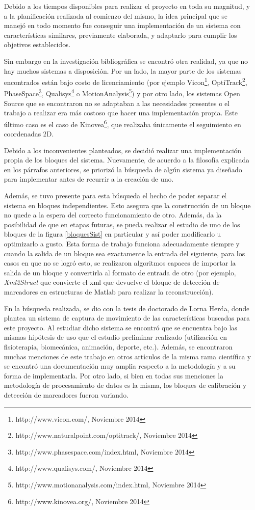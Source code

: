 Debido a los tiempos disponibles para realizar el proyecto en toda su magnitud, y a la planificación realizada al comienzo del mismo, la idea principal que se manejó en todo momento fue conseguir una implementación de un sistema con características similares, previamente elaborada, y adaptarlo para cumplir los objetivos establecidos. 

Sin embargo en la investigación bibliográfica se encontró otra realidad, ya que no hay muchos sistemas a disposición. Por un lado, la mayor parte de los sistemas encontrados están bajo costo de licenciamiento (por ejemplo Vicon\footnote{http://www.vicon.com/, Noviembre 2014}, OptiTrack\footnote{http://www.naturalpoint.com/optitrack/, Noviembre 2014}, PhaseSpace\footnote{http://www.phasespace.com/index.html, Noviembre 2014}, Qualisys\footnote{http://www.qualisys.com/, Noviembre 2014} o MotionAnalysis\footnote{http://www.motionanalysis.com/index.html, Noviembre 2014}) y por otro lado, los sistemas Open Source que se encontraron no se adaptaban a las necesidades presentes o el trabajo a realizar era más costoso que hacer una implementación propia. Este último caso es el caso de Kinovea\footnote{http://www.kinovea.org/, Noviembre 2014}, que realizaba únicamente el seguimiento en coordenadas 2D.

Debido a los inconvenientes planteados, se decidió realizar una implementación propia de los bloques del sistema. Nuevamente, de acuerdo a la filosofía explicada en los párrafos anteriores, se priorizó la búsqueda de algún sistema ya diseñado para implementar antes de recurrir a la creación de uno.

Además, se tuvo presente para esta búsqueda el hecho de poder separar el sistema en bloques independientes. Esto asegura que la construcción de un bloque no quede a la espera del correcto funcionamiento de otro. Además, da la posibilidad de que en etapas futuras, se pueda realizar el estudio de uno de los bloques de la figura \ref{bloquesSist} en particular y así poder modificarlo u optimizarlo a gusto. Esta forma de trabajo funciona adecuadamente siempre y cuando la salida de un bloque sea exactamente la entrada del siguiente, para los casos en que no se logró esto, se realizaron algoritmos capaces de importar la salida de un bloque y convertirla al formato de entrada de otro (por ejemplo, \textit{Xml2Struct} que convierte el xml que devuelve el bloque de detección de marcadores en estructuras de Matlab para realizar la reconstrucción).

En la búsqueda realizada, se dio con la tesis de doctorado de Lorna Herda\cite{herda}, donde plantea un sistema de captura de movimiento de las características buscadas para este proyecto. Al estudiar dicho sistema se encontró que se encuentra bajo las mismas hipótesis de uso que el estudio preliminar realizado (utilización en fisioterapia, biomecánica, animación, deporte, etc.). Además, se encontraron muchas menciones de este trabajo en otros artículos de la misma rama científica y se encontró una documentación muy amplia respecto a la metodología y a su forma de implementarla. Por otro lado, si bien en todas sus menciones la metodología de procesamiento de datos es la misma, los bloques de calibración y detección de marcadores fueron variando.

